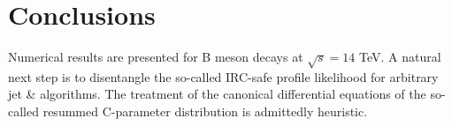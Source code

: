 \section{Conclusions}\label{sec:conclusions}

Numerical results are presented for B meson decays at $\sqrt{s} = 14$
TeV. A natural next step is to disentangle the so-called IRC-safe
profile likelihood for arbitrary jet & algorithms. The treatment of the
canonical differential equations of the so-called resummed C-parameter
distribution is admittedly heuristic.

